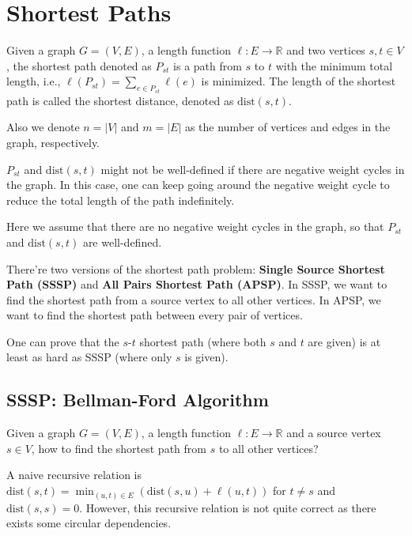 \chapter{Shortest Paths}

\begin{definition}
	Given a graph $G = (V, E)$, a length function $\ell: E \to \mathbb{R}$ and two vertices $s, t \in V$, the shortest path denoted as $P_{st}$ is a path from $s$ to $t$ with the minimum total length, i.e., $\ell(P_{st}) = \sum_{e \in P_{st}} \ell(e)$ is minimized.	The length of the shortest path is called the shortest distance, denoted as $\text{dist}(s, t)$.

	Also we denote $n = |V|$ and $m = |E|$ as the number of vertices and edges in the graph, respectively.
\end{definition}

\begin{remark}
	$P_{st}$ and $\text{dist}(s,t)$ might not be well-defined if there are negative weight cycles in the graph. In this case, one can keep going around the negative weight cycle to reduce the total length of the path indefinitely.

	Here we assume that there are no negative weight cycles in the graph, so that $P_{st}$ and $\text{dist}(s,t)$ are well-defined.
\end{remark}

There're two versions of the shortest path problem: \textbf{Single Source Shortest Path (SSSP)} and \textbf{All Pairs Shortest Path (APSP)}. In SSSP, we want to find the shortest path from a source vertex to all other vertices. In APSP, we want to find the shortest path between every pair of vertices.

One can prove that the $s$-$t$ shortest path (where both $s$ and $t$ are given) is at least as hard as SSSP (where only $s$ is given).

\section{SSSP: Bellman-Ford Algorithm}

\begin{problem}
Given a graph $G = (V, E)$, a length function $\ell: E \to \mathbb{R}$ and a source vertex $s \in V$, how to find the shortest path from $s$ to all other vertices?
\end{problem}

A naive recursive relation is $\text{dist}(s, t) = \min_{(u, t) \in E} (\text{dist}(s, u) + \ell(u, t))$ for $t \neq s$ and $\text{dist}(s, s) = 0$. However, this recursive relation is not quite correct as there exists some circular dependencies.

